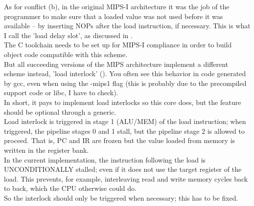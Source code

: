     As for conflict (b), in the original MIPS-I architecture it was the job
    of the programmer to make sure that a loaded value was not used before it
    was available -- by inserting NOPs after the load instruction, if necessary.
    This is what I call the 'load delay slot', as discussed in \cite[p.~13-1]{r3k_ref_man}.\\
    
    The C toolchain needs to be set up for MIPS-I compliance in order to build
    object code compatible with this scheme.\\
    But all succeeding versions of the MIPS architecture implement a 
    different scheme instead, 'load interlock' (\cite[p.~28]{see_mips_run}). You often see
    this behavior in code generated by gcc, even when using the -mips1 flag (this 
    is probably due to the precompiled support code or libc, I have to check).\\
    In short, it pays to implement load interlocks so this core does, but the
    feature should be optional through a generic.\\
    
    
    Load interlock is triggered in stage 1 (ALU/MEM) of the load instruction;
    when triggered, the pipeline stages 0 and 1 stall, but the pipeline stage
    2 is allowed to proceed. That is, PC and IR are frozen but the value loaded
    from memory is written in the register bank.\\
    
    In the current implementation, the instruction following the load is 
    UNCONDITIONALLY stalled; even if it does not use the target register of the 
    load. This prevents, for example, interleaving read and write memory cycles
    back to back, which the CPU otherwise could do.\\
    So the interlock should only be triggered when necessary; this has to be
    fixed.\\

